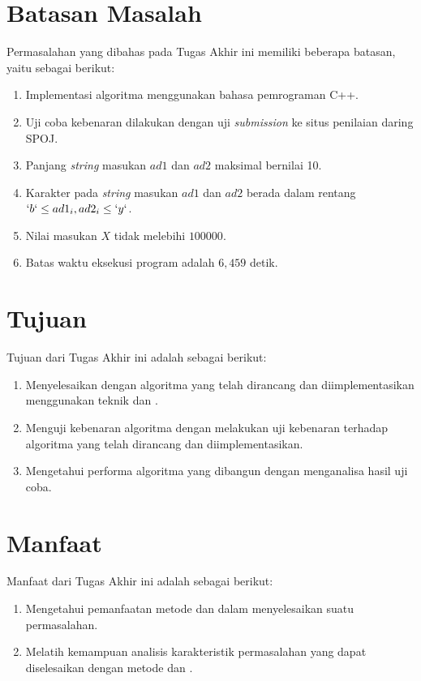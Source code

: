 \section{Batasan Masalah}
Permasalahan yang dibahas pada Tugas Akhir ini memiliki beberapa batasan, yaitu sebagai berikut:

\begin{enumerate}
	\item Implementasi algoritma menggunakan bahasa pemrograman C++.
	\item Uji coba kebenaran dilakukan dengan uji \textit{submission} ke situs penilaian daring SPOJ.
	\item Panjang \textit{string} masukan $ ad1 $ dan $ ad2 $ maksimal bernilai 10.
	\item Karakter pada \textit{string} masukan $ ad1 $ dan $ ad2 $ berada dalam rentang $ `b` \le ad1_{i}, ad2_{i} \le `y` $.
	\item Nilai masukan $ X $ tidak melebihi $ 100000 $.
	\item Batas waktu eksekusi program adalah $ 6,459 $ detik. 
\end{enumerate}

\section{Tujuan}
Tujuan dari Tugas Akhir ini adalah sebagai berikut:

\begin{enumerate}
	\item Menyelesaikan \problem{} dengan algoritma yang telah dirancang dan diimplementasikan menggunakan teknik \dynamicprogramming{} dan \meetinthemiddle{}.
	\item Menguji kebenaran algoritma dengan melakukan uji kebenaran terhadap algoritma yang telah dirancang dan diimplementasikan.
	\item Mengetahui performa algoritma yang dibangun dengan menganalisa hasil uji coba.
\end{enumerate}

\section{Manfaat}
Manfaat dari Tugas Akhir ini adalah sebagai berikut:

\begin{enumerate}
	\item Mengetahui pemanfaatan metode \dynamicprogramming{} dan \meetinthemiddle{} dalam menyelesaikan suatu permasalahan.
	\item Melatih kemampuan analisis karakteristik permasalahan yang dapat diselesaikan dengan metode \dynamicprogramming{} dan \meetinthemiddle{}.
\end{enumerate}

